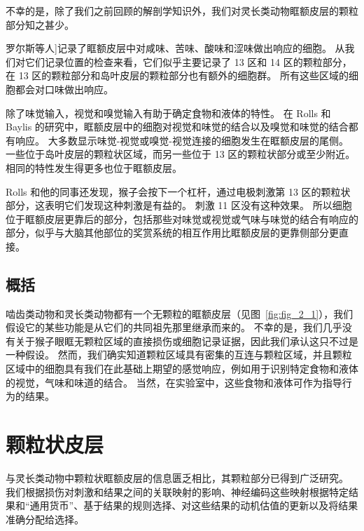 不幸的是，除了我们之前回顾的解剖学知识外，我们对灵长类动物眶额皮层的颗粒部分知之甚少。\par


罗尔斯等人\cite{rolls1994emotion}]记录了眶额皮层中对咸味、苦味、酸味和涩味做出响应的细胞。
从我们对它们记录位置的检查来看，它们似乎主要记录了 13 区和 14 区的颗粒部分，在 13 区的颗粒部分和岛叶皮层的颗粒部分也有额外的细胞群。
所有这些区域的细胞都会对口味做出响应。\par


除了味觉输入，视觉和嗅觉输入有助于确定食物和液体的特性。
在 Rolls 和 Baylis 的研究中，眶额皮层中的细胞对视觉和味觉的结合以及嗅觉和味觉的结合都有响应。
大多数显示味觉-视觉或嗅觉-视觉连接的细胞发生在眶额皮层的尾侧。
一些位于岛叶皮层的颗粒状区域，而另一些位于 13 区的颗粒状部分或至少附近。
相同的特性发生得更多也位于眶额皮层。\par


Rolls 和他的同事还发现，猴子会按下一个杠杆，通过电极刺激第 13 区的颗粒状部分，这表明它们发现这种刺激是有益的\cite{mora1980electrophysiological}。
刺激 11 区没有这种效果。
所以细胞位于眶额皮层更靠后的部分，包括那些对味觉或视觉或气味与味觉的结合有响应的部分，似乎与大脑其他部位的奖赏系统的相互作用比眶额皮层的更靠侧部分更直接。\par



\subsection{概括}

啮齿类动物和灵长类动物都有一个无颗粒的眶额皮层（见图~\ref{fig:fig_2_1}），我们假设它的某些功能是从它们的共同祖先那里继承而来的。
不幸的是，我们几乎没有关于猴子眼眶无颗粒区域的直接损伤或细胞记录证据，因此我们承认这只不过是一种假设。
然而，我们确实知道颗粒区域具有密集的互连与颗粒区域，并且颗粒区域中的细胞具有我们在此基础上期望的感觉响应，例如用于识别特定食物和液体的视觉，气味和味道的结合。
当然，在实验室中，这些食物和液体可作为指导行为的结果。\par



\section{颗粒状皮层}

与灵长类动物中颗粒状眶额皮层的信息匮乏相比，其颗粒部分已得到广泛研究。
我们根据损伤对刺激和结果之间的关联映射的影响、神经编码这些映射根据特定结果和“通用货币”、基于结果的规则选择、对这些结果的动机估值的更新以及将结果准确分配给选择。



